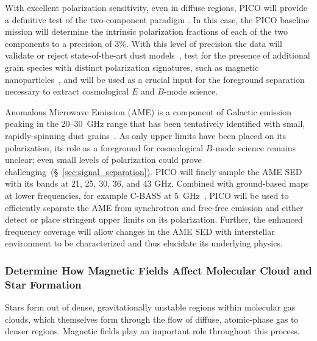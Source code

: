 \documentclass[PICOReport.tex]{subfiles}
\begin{document}
With excellent polarization sensitivity, even in diffuse regions, PICO will provide a definitive test of the two-component paradigm \citep{Meisner2015}. 
In this case, the PICO baseline mission will determine the intrinsic polarization fractions of each of the two components to a precision of 3\%. With this level of precision the data will validate or reject state-of-the-art dust models~\citep[e.g.][Hensley \& Draine, in prep]{Guillet2018}, test for the presence of additional grain species with distinct polarization signatures, such as magnetic nanoparticles~\citep{Draine2013}, and will be used as a crucial input for the foreground separation necessary to extract cosmological $E$ and $B$-mode science. 

Anomalous Microwave Emission (AME) is a component of Galactic emission peaking in the 20--30~GHz range that has been tentatively identified with small, rapidly-spinning dust grains~\citep{dickinson/etal:2018}. As only upper limits have been placed on its polarization, its role as a foreground for cosmological $B$-mode science remains unclear; even small levels of polarization could prove challenging~(\S~\ref{sec:signal_separation}). PICO will finely sample the AME SED with its bands at 21, 25, 30, 36, and 43 GHz. Combined with ground-based maps at lower frequencies, for example C-BASS at 5~GHz~\citep{Dickinson2018a}, PICO will be used to efficiently separate the AME from synchrotron and free-free emission and either detect or place stringent upper limits on its polarization. Further, the enhanced frequency coverage will allow changes in the AME SED with interstellar environment to be characterized and thus elucidate its underlying physics.

\subsubsection{Determine How Magnetic Fields Affect Molecular Cloud and Star Formation}
\label{sec:magnetic_fields}

Stars form out of dense, gravitationally unstable regions within molecular gas clouds, which themselves form through the flow of diffuse, atomic-phase gas to denser regions. Magnetic fields play an important role throughout this process. 
\end{document}
